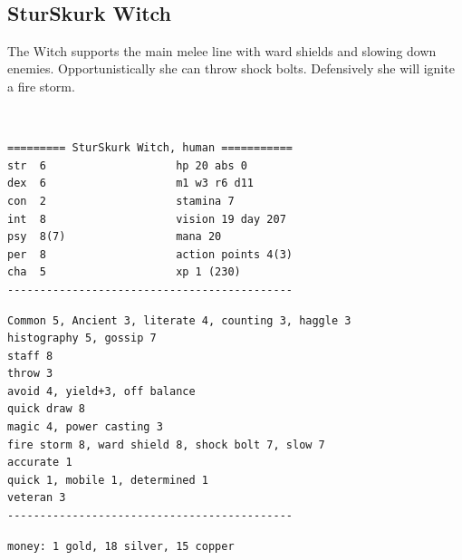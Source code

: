 \


\subsection*{SturSkurk Witch}

The Witch supports the main melee line with ward shields and slowing down enemies. Opportunistically she can throw shock bolts. Defensively she will ignite a fire storm.

\

\goodbreak \small \begin{samepage} \begin{verbatim}
========= SturSkurk Witch, human ===========
str  6                    hp 20 abs 0
dex  6                    m1 w3 r6 d11
con  2                    stamina 7
int  8                    vision 19 day 207
psy  8(7)                 mana 20
per  8                    action points 4(3)
cha  5                    xp 1 (230)
--------------------------------------------
\end{verbatim} \end{samepage} \goodbreak \begin{samepage} \begin{verbatim}
Common 5, Ancient 3, literate 4, counting 3, haggle 3
histography 5, gossip 7
staff 8
throw 3
avoid 4, yield+3, off balance
quick draw 8
magic 4, power casting 3
fire storm 8, ward shield 8, shock bolt 7, slow 7
accurate 1
quick 1, mobile 1, determined 1
veteran 3
--------------------------------------------
\end{verbatim} \end{samepage} \goodbreak \begin{samepage} \begin{verbatim}
money: 1 gold, 18 silver, 15 copper


\end{verbatim}
\end{samepage}
